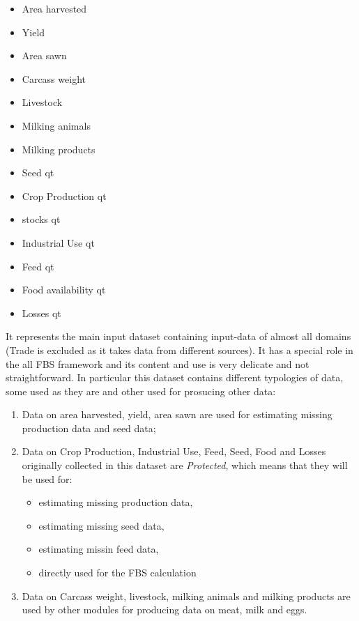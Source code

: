 \documentclass[]{article}
\providecommand{\tightlist}{%
  \setlength{\itemsep}{0pt}\setlength{\parskip}{0pt}}
\begin{document}
\begin{itemize}
\tightlist
\item
  Area harvested
\item
  Yield
\item
  Area sawn
\item
  Carcass weight
\item
  Livestock
\item
  Milking animals
\item
  Milking products
\item
  Seed qt
\item
  Crop Production qt
\item
  stocks qt
\item
  Industrial Use qt
\item
  Feed qt
\item
  Food availability qt
\item
  Losses qt
\end{itemize}

It represents the main input dataset containing input-data of almost all
domains (Trade is excluded as it takes data from different sources). It
has a special role in the all FBS framework and its content and use is
very delicate and not straightforward. In particular this dataset
contains different typologies of data, some used as they are and other
used for prosucing other data:

\begin{enumerate}
\def\labelenumi{\arabic{enumi}.}
\tightlist
\item
  Data on area harvested, yield, area sawn are used for estimating
  missing production data and seed data;
\item
  Data on Crop Production, Industrial Use, Feed, Seed, Food and Losses
  originally collected in this dataset are \emph{Protected}, which means
  that they will be used for:

  \begin{itemize}
  \tightlist
  \item
    estimating missing production data,
  \item
    estimating missing seed data,
  \item
    estimating missin feed data,
  \item
    directly used for the FBS calculation
  \end{itemize}
\item
  Data on Carcass weight, livestock, milking animals and milking
  products are used by other modules for producing data on meat, milk
  and eggs.
\end{enumerate}
\end{document}
